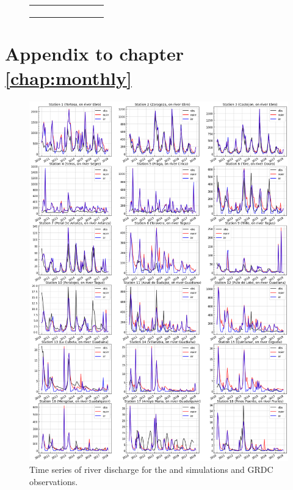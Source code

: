 \begin{figure}[htbp]
\begin{tabular}{ccc}
\begin{subfigure}[b]{0.33\textwidth}
        \end{subfigure}
    \end{tabular}
    \caption{}
    \label{fig:domain_size_ERA_reldiff_maps}
\end{figure}

\clearpage
 
\section*{Appendix to chapter \ref{chap:monthly}}

\begin{figure}[htbp]
    \centering
    \includegraphics[width=\textwidth]{images/chap4/article/18_stations_TS.png}
    \caption{Time series of river discharge for the \irr and \noirr simulations and GRDC observations.}
    \label{fig:TS_discharge_18stations}
\end{figure}

